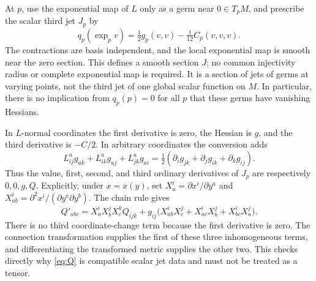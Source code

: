 \documentclass[10pt,letterpaper]{article}
\begin{document}
At $p$, use the exponential map of $L$ only as a germ near $0\in T_pM$,
and prescribe the scalar third jet $J_p$ by
\begin{equation}\label{eq:germ}
 q_p(\exp_p v)=\tfrac12 g_p(v,v)-\tfrac1{12}C_p(v,v,v).
\end{equation}
The contractions are basis independent, and the local exponential map is
smooth near the zero section. This defines a smooth section $J$; no common
injectivity radius or complete exponential map is required. It is a section
of jets of germs at varying points, not the third jet of one global scalar
function on $M$. In particular, there is no implication from $q_p(p)=0$
for all $p$ that these germs have vanishing Hessians.

In $L$-normal coordinates the first derivative is zero, the Hessian is $g$,
and the third derivative is $-C/2$. In arbitrary coordinates the conversion
adds
\[
 L_{ij}^{a}g_{ak}+L_{ik}^{a}g_{aj}+L_{jk}^{a}g_{ai}
 =\tfrac12(\partial_i g_{jk}+\partial_j g_{ik}+\partial_k g_{ij}).
\]
Thus the value, first, second, and third ordinary derivatives of $J_p$ are
respectively $0,0,g,Q$. Explicitly, under $x=x(y)$, set
$X_a^i=\partial x^i/\partial y^a$ and
$X_{ab}^i=\partial^2x^i/(\partial y^a\partial y^b)$. The chain rule gives
\begin{equation}\label{eq:chartlaw}
 Q'_{abc}=X_a^iX_b^jX_c^k Q_{ijk}
 +g_{ij}\bigl(X_{ab}^iX_c^j+X_{ac}^iX_b^j+X_{bc}^iX_a^j\bigr).
\end{equation}
There is no third coordinate-change term because the first derivative is
zero. The connection transformation supplies the first of these three
inhomogeneous terms, and differentiating the transformed metric supplies
the other two. This checks directly why \eqref{eq:Q} is compatible scalar
jet data and must not be treated as a tensor.
\end{document}
